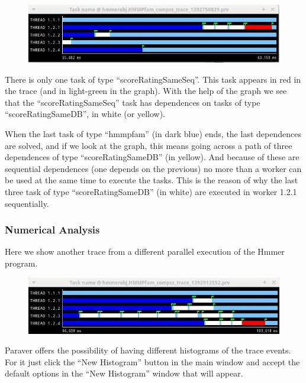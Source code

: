 \begin{figure}[ht!]
  \centering
    \includegraphics[width=1.0\textwidth]{./Sections/7_Tracing/Figures/10.jpeg}
\end{figure}


There is only one task of type ``scoreRatingSameSeq''. This task appears in red in the trace (and in light-green in the graph). With the help of the graph we see that the “scoreRatingSameSeq” task has dependences on tasks of type ``scoreRatingSameDB'', in white (or yellow).

When the last task of type ``hmmpfam'' (in dark blue) ends, the last dependences are solved, and if we look at the graph, this means going across a path of three dependences of type ``scoreRatingSameDB'' (in yellow). And because of these are sequential dependences (one depends on the previous) no more than a worker can be used at the same time to execute the tasks. This is the reason of why the last three task of type ``scoreRatingSameDB'' (in white) are executed in worker 1.2.1 sequentially.

\subsubsection{Numerical Analysis}
Here we show another trace from a different parallel execution of the Hmmer program.
 
\begin{figure}[ht!]
  \centering
    \includegraphics[width=1.0\textwidth]{./Sections/7_Tracing/Figures/11.jpeg}
\end{figure} 
 
Paraver offers the possibility of having different histograms of the trace events. For it just click the “New Histogram” button in the main window and accept the default options in the “New Histogram” window that will appear.

